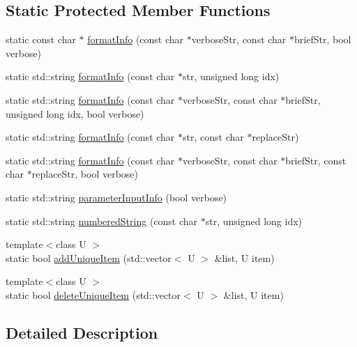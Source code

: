 \subsection*{Static Protected Member Functions}
\begin{DoxyCompactItemize}
\item 
static const char $\ast$ \hyperlink{class_frame_lib___object_a2cb965a15f4634a5fdddc2b009005211}{format\+Info} (const char $\ast$verbose\+Str, const char $\ast$brief\+Str, bool verbose)
\item 
static std\+::string \hyperlink{class_frame_lib___object_ab11cf702a6158f0cd9952ceaaf6c4952}{format\+Info} (const char $\ast$str, unsigned long idx)
\item 
static std\+::string \hyperlink{class_frame_lib___object_aa30676408b8f8161894eb0e533a8522b}{format\+Info} (const char $\ast$verbose\+Str, const char $\ast$brief\+Str, unsigned long idx, bool verbose)
\item 
static std\+::string \hyperlink{class_frame_lib___object_a784bf34c1ef238872b64b9668e23de28}{format\+Info} (const char $\ast$str, const char $\ast$replace\+Str)
\item 
static std\+::string \hyperlink{class_frame_lib___object_a7babe2dd654fbd0c8c05eb7f7ea31550}{format\+Info} (const char $\ast$verbose\+Str, const char $\ast$brief\+Str, const char $\ast$replace\+Str, bool verbose)
\item 
static std\+::string \hyperlink{class_frame_lib___object_a7c57bdfc3fa9a9bb34b607ffa240d47e}{parameter\+Input\+Info} (bool verbose)
\item 
static std\+::string \hyperlink{class_frame_lib___object_a26307f11e68962614da4178115e665b7}{numbered\+String} (const char $\ast$str, unsigned long idx)
\item 
{\footnotesize template$<$class U $>$ }\\static bool \hyperlink{class_frame_lib___object_aa06caf2148631c1a6c3204ac6d8b2bc7}{add\+Unique\+Item} (std\+::vector$<$ U $>$ \&list, U item)
\item 
{\footnotesize template$<$class U $>$ }\\static bool \hyperlink{class_frame_lib___object_aa3bdc91a5f12b72e57fbb010e1827f57}{delete\+Unique\+Item} (std\+::vector$<$ U $>$ \&list, U item)
\end{DoxyCompactItemize}


\subsection{Detailed Description}

